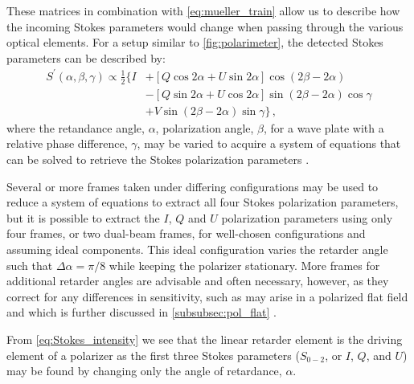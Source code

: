 These matrices in combination with \autoref{eq:mueller_train} allow us to describe how the incoming Stokes parameters would change when passing through the various optical elements. For a setup similar to \autoref{fig:polarimeter}, the detected Stokes parameters can be described by:
\begin{equation}
    \begin{split}
        S^{\prime}(\alpha, \beta, \gamma) \propto \frac{1}{2} \{ I & + [Q \cos2\alpha + U \sin2\alpha] \cos(2\beta - 2\alpha) \\
        & - [Q \sin2\alpha + U \cos2\alpha] \sin(2\beta - 2\alpha) \cos\gamma \label{eq:Stokes_intensity} \\
        & + V \sin(2\beta - 2\alpha)\sin\gamma \}\,,
    \end{split}
\end{equation}
where the retandance angle, $\alpha$, polarization angle, $\beta$, for a wave plate with a relative phase difference, $\gamma$, may be varied to acquire a system of equations that can be solved to retrieve the Stokes polarization parameters \citep{waveplate_in_specpol}.

Several or more frames taken under differing configurations may be used to reduce a system of equations to extract all four Stokes polarization parameters, but it is possible to extract the $I$, $Q$ and $U$ polarization parameters using only four frames, or two dual-beam frames, for well-chosen configurations and assuming ideal components. This ideal configuration varies the retarder angle such that $\Delta\alpha = \pi / 8$ while keeping the polarizer stationary. More frames for additional retarder angles are advisable and often necessary, however, as they correct for any differences in sensitivity, such as may arise in a polarized flat field and which is further discussed in \autoref{subsubsec:pol_flat} \citep{polarimetry_error}.

From \autoref{eq:Stokes_intensity} we see that the linear retarder element is the driving element of a polarizer as the first three Stokes parameters ($S_{0-2}$, or $I$, $Q$, and $U$) may be found by changing only the angle of retardance, $\alpha$.

